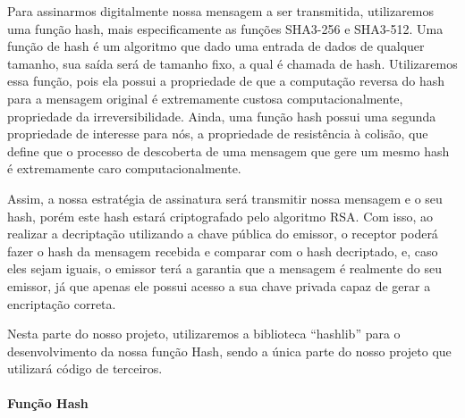 \documentclass[11pt]{article}
\begin{document}
Para assinarmos digitalmente nossa mensagem a ser transmitida,
utilizaremos uma função hash, mais especificamente as funções SHA3-256 e
SHA3-512. Uma função de hash é um algoritmo que dado uma entrada de
dados de qualquer tamanho, sua saída será de tamanho fixo, a qual é
chamada de hash. Utilizaremos essa função, pois ela possui a propriedade
de que a computação reversa do hash para a mensagem original é
extremamente custosa computacionalmente, propriedade da
irreversibilidade. Ainda, uma função hash possui uma segunda propriedade
de interesse para nós, a propriedade de resistência à colisão, que
define que o processo de descoberta de uma mensagem que gere um mesmo
hash é extremamente caro computacionalmente.

Assim, a nossa estratégia de assinatura será transmitir nossa mensagem e
o seu hash, porém este hash estará criptografado pelo algoritmo RSA. Com
isso, ao realizar a decriptação utilizando a chave pública do emissor, o
receptor poderá fazer o hash da mensagem recebida e comparar com o hash
decriptado, e, caso eles sejam iguais, o emissor terá a garantia que a
mensagem é realmente do seu emissor, já que apenas ele possui acesso a
sua chave privada capaz de gerar a encriptação correta.

Nesta parte do nosso projeto, utilizaremos a biblioteca ``hashlib'' para
o desenvolvimento da nossa função Hash, sendo a única parte do nosso
projeto que utilizará código de terceiros.

\hypertarget{funuxe7uxe3o-hash}{%
\paragraph{Função Hash}\label{funuxe7uxe3o-hash}}
\end{document}
